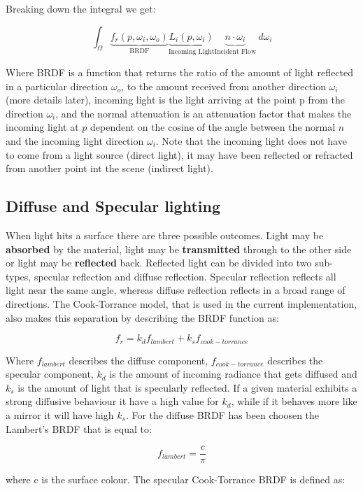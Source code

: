 \noindent Breaking down the integral we get:

\begin{equation}
\int_\Omega \underbrace{f_r(p,\omega_i,\omega_o)}_\text{BRDF}\underbrace{L_i(p,\omega_i)}_\text{Incoming Light}\underbrace{n\cdot\omega_i}_\text{Incident Flow}\ d\omega_i
\end{equation}

Where BRDF is a function that returns the ratio of the amount of light reflected in a particular direction $\omega_o$, to the
amount received from another direction $\omega_i$ (more details later), incoming light is the light arriving at the point p
from the direction $\omega_i$, and the normal attenuation is an attenuation factor that makes the incoming light at $p$
dependent on the cosine of the angle between the normal $n$ and the incoming light direction $\omega_i$. Note that the
incoming light does not have to come from a light source (direct light), it may have been reflected or refracted from another
point int the scene (indirect light).

\subsection{Diffuse and Specular lighting}
When light hits a surface there are three possible outcomes. Light may be \textbf{absorbed} by the material, light may be
\textbf{transmitted} through to the other side or light may be \textbf{reflected} back.
Reflected light can be divided into two sub-types, specular reflection and diffuse reflection. Specular reflection reflects
all light near the same angle, whereas diffuse reflection reflects in a broad range of directions.
The Cook-Torrance model, that is used in the current implementation, also makes this separation by describing the BRDF
function as:

$$f_r = k_d f_{lambert} + k_s f_{cook-torrance}$$

Where $f_{lambert}$ describes the diffuse component, $f_{cook-torrance}$ describes the specular component, $k_d$ is the amount
of incoming radiance that gets diffused and $k_s$ is the amount of light that is specularly reflected. If a given material
exhibits a strong diffusive behaviour it have a high value for $k_d$, while if it behaves more like a mirror it will have high $k_s$.
For the diffuse BRDF has been choosen the Lambert's BRDF that is equal to:

$$f_{lambert} = \frac{c}{\pi}$$

where c is the surface colour. The specular Cook-Torrance BRDF is defined as:

